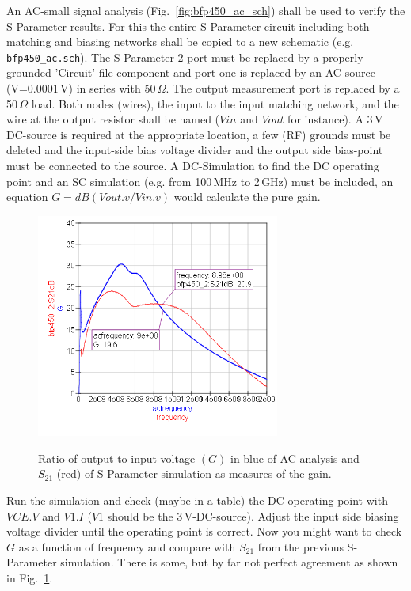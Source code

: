 An AC-small signal analysis (Fig.~\ref{fig:bfp450_ac_sch}) shall be
used to verify the S-Parameter results. For this the entire
S-Parameter circuit including both matching and biasing networks shall
be copied to a new schematic (e.g. {\tt bfp450\_ac.sch}). The
S-Parameter 2-port must be replaced by a properly grounded 'Circuit'
file component and port one is replaced by an AC-source (V=0.0001\,V)
in series with 50\,$\Omega$. The output measurement port is replaced
by a 50\,$\Omega$ load. Both nodes (wires), the input to the input
matching network, and the wire at the output resistor shall be named
($Vin$ and $Vout$ for instance). A 3\,V DC-source is required at the
appropriate location, a few (RF) grounds must be deleted and the
input-side bias voltage divider and the output side bias-point must be
connected to the source. A DC-Simulation to find the DC operating
point and an SC simulation (e.g. from 100\,MHz to 2\,GHz) must be
included, an equation $G=dB(Vout.v/Vin.v)$ would calculate the pure
gain.

\begin{figure}
  \centering
  {\includegraphics[width=8cm]{bfp450_ac_result.png}}
  \caption{Ratio of output to input voltage $(G)$ in blue of
    AC-analysis and $S_{21}$ (red) of S-Parameter simulation as
    measures of the gain.}
  \label{fig:bfp450_ac_result}
\end{figure}


Run the simulation and check (maybe in a table) the DC-operating point
with $VCE.V$ and $V1.I$ ($V1$ should be the 3\,V-DC-source). Adjust the
input side biasing voltage divider until the operating point is
correct. Now you might want to check $G$ as a function of frequency
and compare with $S_{21}$ from the previous S-Parameter
simulation. There is some, but by far not perfect agreement as shown
in Fig.~\ref{fig:bfp450_ac_result}.

